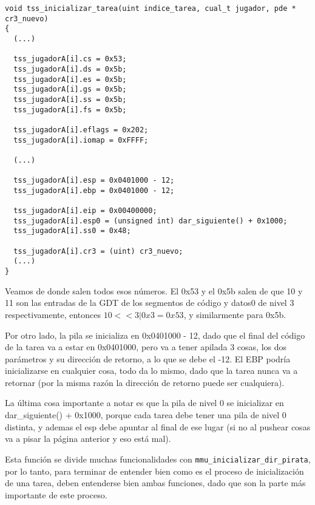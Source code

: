 \begin{lstlisting}
void tss_inicializar_tarea(uint indice_tarea, cual_t jugador, pde * cr3_nuevo)
{
  (...)

  tss_jugadorA[i].cs = 0x53;
  tss_jugadorA[i].ds = 0x5b;
  tss_jugadorA[i].es = 0x5b;
  tss_jugadorA[i].gs = 0x5b;
  tss_jugadorA[i].ss = 0x5b;
  tss_jugadorA[i].fs = 0x5b;

  tss_jugadorA[i].eflags = 0x202;
  tss_jugadorA[i].iomap = 0xFFFF;

  (...)  

  tss_jugadorA[i].esp = 0x0401000 - 12; 
  tss_jugadorA[i].ebp = 0x0401000 - 12; 

  tss_jugadorA[i].eip = 0x00400000;
  tss_jugadorA[i].esp0 = (unsigned int) dar_siguiente() + 0x1000;
  tss_jugadorA[i].ss0 = 0x48;  

  tss_jugadorA[i].cr3 = (uint) cr3_nuevo;
  (...) 
}
\end{lstlisting}

\par Veamos de donde salen todos esos números. El 0x53 y el 0x5b salen de que 10 y 11 son las entradas de la GDT de los segmentos de código y datos0 de nivel 3 respectivamente, entonces $10 << 3 | 0x3 = 0x53$, y similarmente para 0x5b.

\par Por otro lado, la pila se inicializa en 0x0401000 - 12, dado que el final del código de la tarea va a estar en 0x0401000, pero va a tener apilada 3 cosas, los dos parámetros y su dirección de retorno, a lo que se debe el -12. El EBP podría inicializarse en cualquier cosa, todo da lo mismo, dado que la tarea nunca va a retornar (por la misma razón la dirección de retorno puede ser cualquiera).

\par La última cosa importante a notar es que la pila de nivel 0 se inicializar en dar_siguiente() + 0x1000, porque cada tarea debe tener una pila de nivel 0 distinta, y ademas el esp debe apuntar al final de ese lugar (si no al pushear cosas va a pisar la página anterior y eso está mal).

\par Esta función se divide muchas funcionalidades con \texttt{mmu_inicializar_dir_pirata}, por lo tanto, para terminar de entender bien como es el proceso de inicialización de una tarea, deben entenderse bien ambas funciones, dado que son la parte más importante de este proceso.


